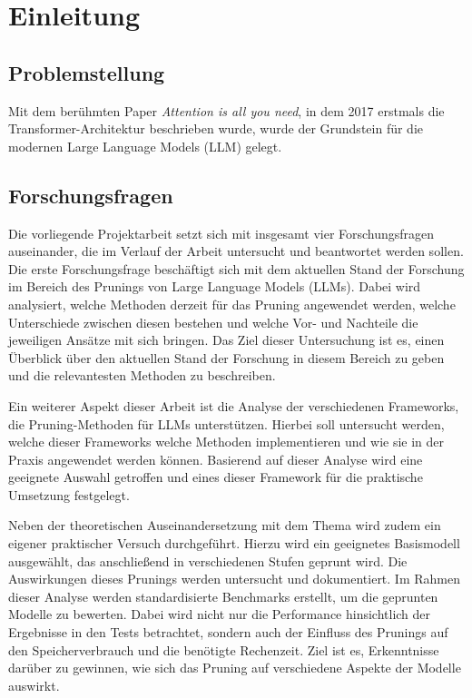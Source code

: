 \section{Einleitung}

\subsection{Problemstellung}

Mit dem berühmten Paper \emph{Attention is all you need}, in dem 2017 erstmals
die Transformer-Architektur beschrieben wurde, wurde der Grundstein für die
modernen Large Language Models (LLM) gelegt.
\autocite[Vlg.][]{vaswani2017attention} 

\subsection{Forschungsfragen}

Die vorliegende Projektarbeit setzt sich mit insgesamt vier Forschungsfragen
auseinander, die im Verlauf der Arbeit untersucht und beantwortet werden sollen.
Die erste Forschungsfrage beschäftigt sich mit dem aktuellen Stand der Forschung
im Bereich des Prunings von Large Language Models (LLMs). Dabei wird analysiert,
welche Methoden derzeit für das Pruning angewendet werden, welche Unterschiede
zwischen diesen bestehen und welche Vor- und Nachteile die jeweiligen Ansätze
mit sich bringen. Das Ziel dieser Untersuchung ist es, einen Überblick über den
aktuellen Stand der Forschung in diesem Bereich zu geben und die relevantesten
Methoden zu beschreiben.

Ein weiterer Aspekt dieser Arbeit ist die Analyse der verschiedenen Frameworks,
die Pruning-Methoden für LLMs unterstützen. Hierbei soll untersucht werden,
welche dieser Frameworks welche Methoden implementieren und wie sie in der
Praxis angewendet werden können. Basierend auf dieser Analyse wird eine
geeignete Auswahl getroffen und eines dieser Framework für die praktische
Umsetzung festgelegt.

Neben der theoretischen Auseinandersetzung mit dem Thema wird zudem ein eigener
praktischer Versuch durchgeführt. Hierzu wird ein geeignetes Basismodell
ausgewählt, das anschließend in verschiedenen Stufen geprunt wird. Die
Auswirkungen dieses Prunings werden untersucht und dokumentiert. Im Rahmen
dieser Analyse werden standardisierte Benchmarks erstellt, um die geprunten
Modelle zu bewerten. Dabei wird nicht nur die Performance hinsichtlich der
Ergebnisse in den Tests betrachtet, sondern auch der Einfluss des Prunings auf
den Speicherverbrauch und die benötigte Rechenzeit. Ziel ist es, Erkenntnisse
darüber zu gewinnen, wie sich das Pruning auf verschiedene Aspekte der Modelle
auswirkt.

